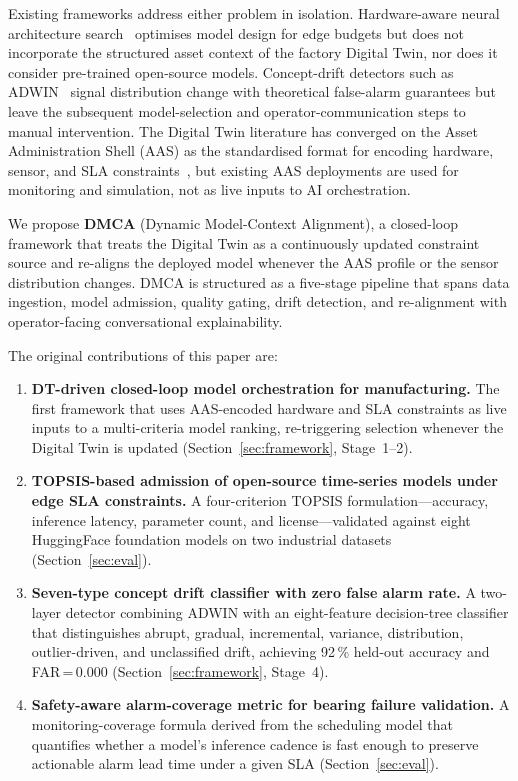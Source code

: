 \documentclass[12pt,a4paper]{article}
\begin{document}
Existing frameworks address either problem in isolation.
Hardware-aware neural architecture search~\cite{Shi2016EdgeComputing}
optimises model design for edge budgets but does not incorporate the
structured asset context of the factory Digital Twin, nor does it
consider pre-trained open-source models.
Concept-drift detectors such as ADWIN~\cite{Bifet2007ADWIN} signal
distribution change with theoretical false-alarm guarantees but leave
the subsequent model-selection and operator-communication steps to
manual intervention.
The Digital Twin literature has converged on the Asset Administration
Shell (AAS) as the standardised format for encoding hardware, sensor,
and SLA constraints~\cite{IEC62890_2020,IDTA_AAS}, but existing AAS
deployments are used for monitoring and simulation, not as live inputs
to AI orchestration.

We propose \textbf{DMCA} (Dynamic Model-Context Alignment), a
closed-loop framework that treats the Digital Twin as a continuously
updated constraint source and re-aligns the deployed model whenever the
AAS profile or the sensor distribution changes.
DMCA is structured as a five-stage pipeline that spans data ingestion,
model admission, quality gating, drift detection, and re-alignment with
operator-facing conversational explainability.

The original contributions of this paper are:

\begin{enumerate}
  \item[\textbf{C1.}] \textbf{DT-driven closed-loop model orchestration
    for manufacturing.}
    The first framework that uses AAS-encoded hardware and SLA
    constraints as live inputs to a multi-criteria model ranking,
    re-triggering selection whenever the Digital Twin is updated
    (Section~\ref{sec:framework}, Stage~1--2).

  \item[\textbf{C2.}] \textbf{TOPSIS-based admission of open-source
    time-series models under edge SLA constraints.}
    A four-criterion TOPSIS formulation---accuracy, inference latency,
    parameter count, and license---validated against eight HuggingFace
    foundation models on two industrial datasets
    (Section~\ref{sec:eval}).

  \item[\textbf{C3.}] \textbf{Seven-type concept drift classifier with
    zero false alarm rate.}
    A two-layer detector combining ADWIN with an eight-feature
    decision-tree classifier that distinguishes abrupt, gradual,
    incremental, variance, distribution, outlier-driven, and
    unclassified drift, achieving 92\,\% held-out accuracy and
    FAR\,=\,0.000 (Section~\ref{sec:framework}, Stage~4).

  \item[\textbf{C4.}] \textbf{Safety-aware alarm-coverage metric for
    bearing failure validation.}
    A monitoring-coverage formula derived from the scheduling model
    that quantifies whether a model's inference cadence is fast enough
    to preserve actionable alarm lead time under a given SLA
    (Section~\ref{sec:eval}).
\end{enumerate}
\end{document}
